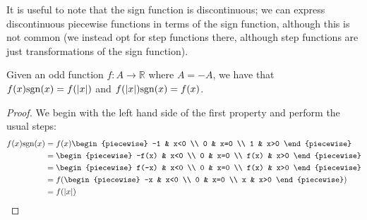 
It is useful to note that the sign function is discontinuous; we can express discontinuous piecewise functions in terms of the sign function, although this is not common (we instead opt for step functions there, although step functions are just transformations of the sign function).

\begin{theorem}
    \label{theorem:odd_sign}
    Given an odd function $f:A\to\mathbb{R}$ where $A=-A$, we have that $f(x)\sgn{x}=f(\abs{x})$ and $f(\abs{x})\sgn{x}=f(x)$.

    \begin{proof}
        We begin with the left hand side of the first property and perform the usual steps:
        \begin{align*}
            f(x)\sgn{x} &= f(x)\begin{piecewise}
                -1 & x<0 \\
                0 & x=0 \\
                1 & x>0
            \end{piecewise}\\
            &= \begin{piecewise}
                -f(x) & x<0 \\
                0 & x=0 \\
                f(x) & x>0
            \end{piecewise}\\
            &= \begin{piecewise}
                f(-x) & x<0 \\
                0 & x=0 \\
                f(x) & x>0
            \end{piecewise}\\
            &= f\paren*{\begin{piecewise}
                -x & x<0 \\
                0 & x=0 \\
                x & x>0
            \end{piecewise}}\\
            &= f(\abs{x})
        \end{align*}
    \end{proof}


\end{theorem}
